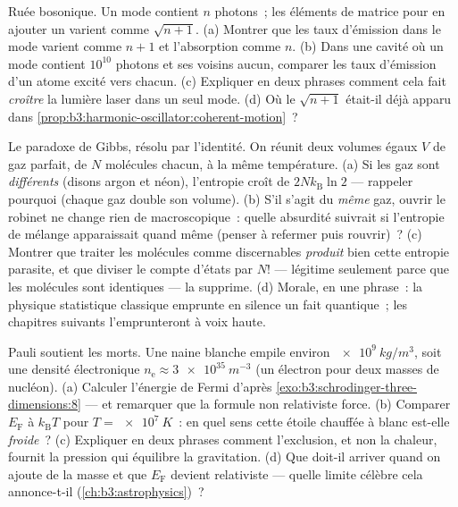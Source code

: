\begin{exercise}[$\star\star$]\label{exo:b3:identical-particles:9}
Ruée bosonique. Un mode contient $n$ photons~; les éléments de matrice
pour en ajouter un varient comme $\sqrt{n+1}$. (a) Montrer que les
taux d'émission dans le mode varient comme $n + 1$ et l'absorption
comme $n$. (b) Dans une cavité où un mode contient $10^{10}$ photons
et ses voisins aucun, comparer les taux d'émission d'un atome excité
vers chacun. (c) Expliquer en deux phrases comment cela fait
\emph{croître} la lumière laser dans un seul mode. (d) Où le
$\sqrt{n+1}$ était-il déjà apparu dans
\cref{prop:b3:harmonic-oscillator:coherent-motion}~?
\end{exercise}

\begin{exercise}[$\star\star\star$]\label{exo:b3:identical-particles:10}
Le paradoxe de Gibbs, résolu par l'identité. On réunit deux volumes
égaux $V$ de gaz parfait, de $N$ molécules chacun, à la même
température. (a) Si les gaz sont \emph{différents} (disons argon et
néon), l'entropie croît de $2Nk_{\text{B}}\ln2$ --- rappeler pourquoi
(chaque gaz double son volume). (b) S'il s'agit du \emph{même} gaz,
ouvrir le robinet ne change rien de macroscopique~: quelle absurdité
suivrait si l'entropie de mélange apparaissait quand même (penser à
refermer puis rouvrir)~? (c) Montrer que traiter les molécules comme
discernables \emph{produit} bien cette entropie parasite, et que
diviser le compte d'états par $N!$ --- légitime seulement parce que
les molécules sont identiques --- la supprime. (d) Morale, en une
phrase~: la physique statistique classique emprunte en silence un fait
quantique~; les chapitres suivants l'emprunteront à voix haute.
\end{exercise}

\begin{exercise}[$\star\star\star$]\label{exo:b3:identical-particles:11}
Pauli soutient les morts. Une naine blanche empile environ
$\qty{e9}{kg/m^3}$, soit une densité électronique $n_{\text{e}} \approx
\qty{3e35}{m^{-3}}$ (un électron pour deux masses de nucléon). (a)
Calculer l'énergie de Fermi d'après
\cref{exo:b3:schrodinger-three-dimensions:8}
--- et remarquer que la formule non relativiste force. (b) Comparer
$E_{\text{F}}$ à $k_{\text{B}}T$ pour $T = \qty{e7}{K}$~: en quel sens
cette étoile chauffée à blanc est-elle \emph{froide}~? (c) Expliquer
en deux phrases comment l'exclusion, et non la chaleur, fournit la
pression qui équilibre la gravitation. (d) Que doit-il arriver quand
on ajoute de la masse et que $E_{\text{F}}$ devient relativiste ---
quelle limite célèbre cela annonce-t-il
(\cref{ch:b3:astrophysics})~?
\end{exercise}

